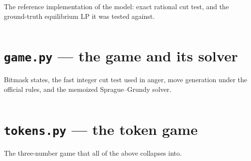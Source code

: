 \documentclass[11pt]{article}
\theoremstyle{definition}
\theoremstyle{remark}
\begin{document}
The reference implementation of the model: exact rational cut test, and
the ground-truth equilibrium LP it was tested against.

\inputminted{python}{stability.py}

\section{\texttt{game.py} --- the game and its solver}

Bitmask states, the fast integer cut test used in anger, move generation
under the official rules, and the memoized Sprague--Grundy solver.

\inputminted{python}{game.py}

\section{\texttt{tokens.py} --- the token game}

The three-number game that all of the above collapses into.

\inputminted{python}{tokens.py}
\end{document}
